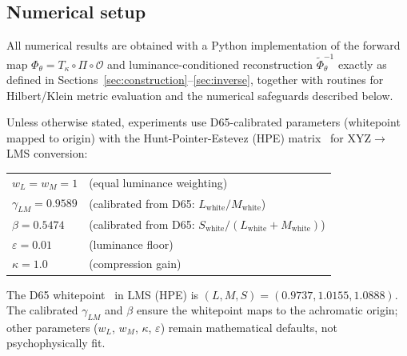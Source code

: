 \documentclass[11pt]{article}
\theoremstyle{plain}
\theoremstyle{definition}
\theoremstyle{remark}
\begin{document}
\subsection{Numerical setup}
\label{sec:exp-setup}

All numerical results are obtained with a Python implementation of the forward map $\Phi_\theta = T_\kappa \circ \Pi \circ \mathcal{O}$ and luminance-conditioned reconstruction $\widetilde{\Phi}_\theta^{-1}$ exactly as defined in Sections~\ref{sec:construction}--\ref{sec:inverse}, together with routines for Hilbert/Klein metric evaluation and the numerical safeguards described below.

Unless otherwise stated, experiments use D65-calibrated parameters (whitepoint mapped to origin) with the Hunt-Pointer-Estevez (HPE) matrix~\cite{HPE} for XYZ$\to$LMS conversion:

\begin{center}
\begin{tabular}{@{}ll@{}}
$w_L = w_M = 1$ & (equal luminance weighting) \\
$\gamma_{LM} = 0.9589$ & (calibrated from D65: $L_{\text{white}}/M_{\text{white}}$) \\
$\beta = 0.5474$ & (calibrated from D65: $S_{\text{white}}/(L_{\text{white}}+M_{\text{white}})$) \\
$\varepsilon = 0.01$ & (luminance floor) \\
$\kappa = 1.0$ & (compression gain) \\
\end{tabular}
\end{center}

The D65 whitepoint~\cite{CIE-D65} in LMS (HPE) is $(L, M, S) = (0.9737, 1.0155, 1.0888)$. The calibrated $\gamma_{LM}$ and $\beta$ ensure the whitepoint maps to the achromatic origin; other parameters ($w_L$, $w_M$, $\kappa$, $\varepsilon$) remain mathematical defaults, not psychophysically fit.
\end{document}
